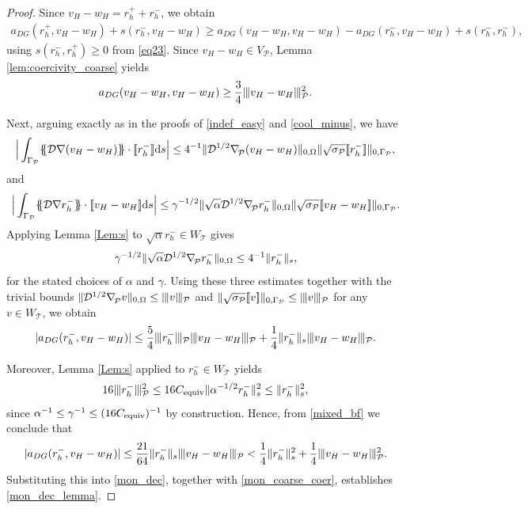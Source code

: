 \documentclass[11pt,final]{amsart}
\theoremstyle{plain}
\theoremstyle{definition}
\newcommand\calP{{\mathcal{P}}}
\newcommand\calT{{\mathcal{T}}}
\newcommand{\mesh}{\calP}
\newcommand{\mean}[1]{\{\kern-1.1mm\{#1\}\kern-1.1mm\}}
\newcommand{\jump}[1]{[\![#1]\!]}                        %
\newcommand{\ndgp}[1]{| \kern -.25mm \|{#1}| \kern -.25mm \|_{\rm \mesh}}
\newcommand{\bnabla}{\nabla_{\kern-.05cm\mesh}^{}}
\begin{document}
\begin{proof}
Since $v_H-w_H=r_h^++r_h^-$, we obtain
\begin{equation}\label{mon_dec}
\begin{aligned}
a_{DG}(r_h^+,v_H-w_H)+s(r_h^-,v_H-w_H) 
 \ge  a_{DG}(v_H-w_H,v_H-w_H)-a_{DG}(r_h^-,v_H-w_H)+s(r_h^-,r_h^-) ,
\end{aligned}
\end{equation}
using $s(r_h^-,r_h^+)\ge 0$ from \eqref{eq23}.  
Since $v_H-w_H\in V_\mesh$, Lemma \ref{lem:coercivity_coarse} yields
\begin{equation}\label{mon_coarse_coer}
a_{DG}(v_H-w_H,v_H-w_H)\ge \frac{3}{4} \ndgp{v_H-w_H}^2.
\end{equation}

Next, arguing exactly as in the proofs of \eqref{indef_easy} and
\eqref{cool_minus}, we have
\[
\Big|\int_{\Gamma_{\calP}}\mean{\mathcal{D}\nabla( v_H-w_H)}\cdot\jump{r_h^-}  \mathrm{d}s\Big|
 \le  4^{-1} \|\mathcal{D}^{1/2}\bnabla ( v_H-w_H)\|_{0,\Omega} 
\|\sqrt{\sigma_\calP}\jump{r_h^-}\|_{0,\Gamma_{\calP}},
\]
and
\[
\Big|\int_{\Gamma_{\calP}}\mean{\mathcal{D}\nabla r_h^-}\cdot\jump{v_H-w_H}  \mathrm{d}s\Big|
 \le  \gamma^{-1/2}  \|\sqrt{\alpha} \mathcal{D}^{1/2}\bnabla r_h^-\|_{0,\Omega} 
\|\sqrt{\sigma_\calP}\jump{ v_H-w_H}\|_{0,\Gamma_{\calP}}.
\]
Applying Lemma \ref{Lem:s} to $\sqrt{\alpha} r_h^-\in W_\calT$ gives
\[
\gamma^{-1/2} \|\sqrt{\alpha} \mathcal{D}^{1/2}\bnabla r_h^-\|_{0,\Omega} \le  4^{-1} \|r_h^-\|_{s},
\]
for the stated choices of $\alpha$ and $\gamma$. Using these three
estimates together with the trivial bounds $\|\mathcal{D}^{1/2}\bnabla
v\|_{0,\Omega}\le \ndgp{v}$ and
$\|\sqrt{\sigma_\mesh}\jump{v}\|_{0,\Gamma_{\calP}}\le \ndgp{v}$ for
any $v\in W_\calT$, we obtain
\begin{equation}\label{mixed_bf}
|a_{DG}(r_h^-,v_H-w_H)|
 \le  \frac{5}{4} \ndgp{r_h^-} \ndgp{v_H-w_H}
+\frac{1}{4} \|r_h^-\|_{s} \ndgp{v_H-w_H}.
\end{equation}

Moreover, Lemma \ref{Lem:s} applied to $r_h^-\in W_\calT$ yields
\begin{equation}\label{twentyfive}
16 \ndgp{r_h^-}^2 \le  16  C_{\rm equiv} \|\alpha^{-1/2}r_h^-\|_{s}^2 \le  \|r_h^-\|_{s}^2,
\end{equation}
since $\alpha^{-1}\le \gamma^{-1}\le(16 C_{\rm equiv})^{-1}$ by
construction. Hence, from \eqref{mixed_bf} we conclude that
\[
|a_{DG}(r_h^-,v_H-w_H)|
 \le  \frac{21}{64} \|r_h^-\|_{s} \ndgp{v_H-w_H}
 <
 \frac{1}{4} \|r_h^-\|_{s}^2+\frac{1}{4} \ndgp{v_H-w_H}^2.
\]
Substituting this into \eqref{mon_dec}, together with
\eqref{mon_coarse_coer}, establishes \eqref{mon_dec_lemma}.
\end{proof}
\end{document}
